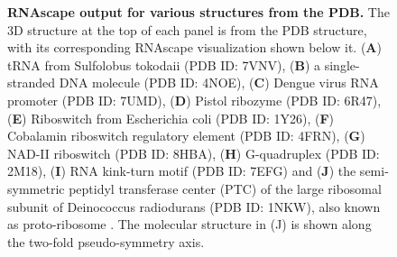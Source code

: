 \begin{center}
    \begin{figure}
        \caption[RNAscape output for various structures from the PDB.]{\textbf{RNAscape output for various structures from the PDB.} The 3D structure at the top of each panel is from the PDB structure, with its corresponding RNAscape visualization shown below it. ({\bf A}) tRNA from Sulfolobus tokodaii (PDB ID: 7VNV), ({\bf B}) a single-stranded DNA molecule (PDB ID: 4NOE), ({\bf C}) Dengue virus RNA promoter (PDB ID: 7UMD), ({\bf D}) Pistol ribozyme (PDB ID: 6R47), ({\bf E}) Riboswitch from Escherichia coli (PDB ID: 1Y26), ({\bf F}) Cobalamin riboswitch regulatory element (PDB ID: 4FRN), ({\bf G}) NAD-II riboswitch (PDB ID: 8HBA), ({\bf H}) G-quadruplex (PDB ID: 2M18), ({\bf I}) RNA kink-turn motif (PDB ID: 7EFG) and ({\bf J}) the semi-symmetric peptidyl transferase center (PTC) of the large ribosomal subunit of Deinococcus radiodurans (PDB ID: 1NKW), also known as proto-ribosome \citep{Bose2022}. The molecular structure in (J) is shown along the two-fold pseudo-symmetry axis.}
  \label{fig:rnascape1}
\end{figure}
\end{center}

